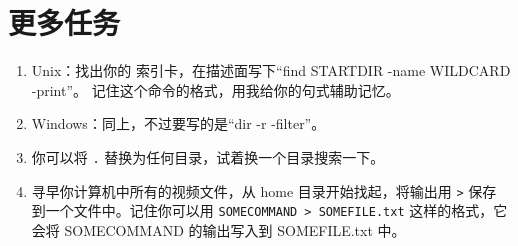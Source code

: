 \section{更多任务}

\begin{enumerate}
\item Unix：找出你的  索引卡，在描述面写下“find STARTDIR -name WILDCARD -print”。
    记住这个命令的格式，用我给你的句式辅助记忆。
\item Windows：同上，不过要写的是“dir -r -filter”。
\item 你可以将 \verb|.| 替换为任何目录，试着换一个目录搜索一下。
\item 寻早你计算机中所有的视频文件，从 home 目录开始找起，将输出用 \verb|>| 保存
    到一个文件中。记住你可以用 \verb|SOMECOMMAND > SOMEFILE.txt| 这样的格式，它
    会将 SOMECOMMAND 的输出写入到 SOMEFILE.txt 中。
\end{enumerate}

